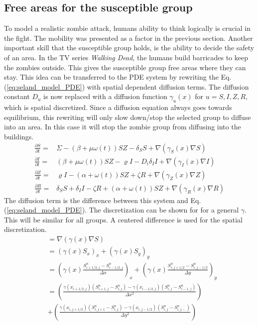 \documentclass[%
twoside,                 %
final,                   %
chapterprefix=true,      %
open=right               %
10pt]{book}
\begin{document}
\noindent






\subsection{Free areas for the susceptible group}
To model a realistic zombie attack, humans ability to think logically is crucial in the fight. The mobility was presented as a factor in the previous section. Another important skill that the susceptible group holds, is the ability to decide the safety of an area. In the TV series \emph{Walking Dead}, the humans build barricades to keep the zombies outside. This gives the susceptible group free areas where they can stay. This idea can be transferred to the PDE system by rewriting the Eq.(\ref{eq:seland_model_PDE}) with spatial dependent diffusion terms. The diffusion constant $D_u$ is now replaced with a diffusion function $\gamma_u(x)$ for $u= S,I,Z,R$, which is spatial discretized. Since a diffusion equation always goes towards equilibrium, this rewriting will only slow down/stop the selected group to diffuse into an area. In this case it will stop the zombie group from diffusing into the buildings. 
\begin{equation} \label{eq:seland_model_diff}
    \begin{aligned} 
    \frac{\partial S}{\partial t} =& \Sigma -(\beta+\mu \omega(t))SZ - \delta_SS +\nabla(\gamma_S(x) \nabla S) \\
    \frac{\partial I}{\partial t} =& (\beta+\mu \omega(t))SZ - \varrho I - D_i\delta_II+\nabla(\gamma_I(x) \nabla I)\\
    \frac{\partial Z}{\partial t} =& \varrho I- (\alpha+\omega(t))SZ + \zeta R+\nabla(\gamma_Z(x) \nabla Z)\\
    \frac{\partial R}{\partial t} =& \delta_SS +\delta_II -\zeta R + (\alpha+\omega(t))SZ+\nabla(\gamma_R(x) \nabla R) 
    \end{aligned}
\end{equation}
The diffusion term is the difference between this system and Eq.(\ref{eq:seland_model_PDE}). The discretization can be shown for for a general $\gamma$. This will be similar for all groups. A centered difference is used for the spatial discretization.
\begin{equation} \label{eq:gamma}
    \begin{aligned}
    &=\nabla(\gamma(x) \nabla S) \\
    &=(\gamma(x) S_x)_x+(\gamma(x) S_y)_y \\
    &= \left(\gamma(x) \frac{S^{n}_{i+1/2,j}-S^{n}_{i-1/2,j}}{\Delta x}\right)_x+\left(\gamma(x) \frac{S^{n}_{i,j+1/2}-S^{n}_{i,j-1/2}}{\Delta y}\right)_y \\
    &= \left(\frac{\gamma(x_{i+1/2,j})(S^{n}_{i+1,j}-S^{n}_{i,j})-\gamma(x_{i-1/2,j})(S^{n}_{i,j}-S^{n}_{i-1,j})}{\Delta x^2}\right) \\
    &+ \left(\frac{\gamma(x_{i,j+1/2})(S^{n}_{i,j+1}-S^{n}_{i,j})-\gamma(x_{i,j-1/2})(S^{n}_{i,j}-S^{n}_{i,j-})}{\Delta y^2}\right)
    \end{aligned}
\end{equation}
\end{document}
